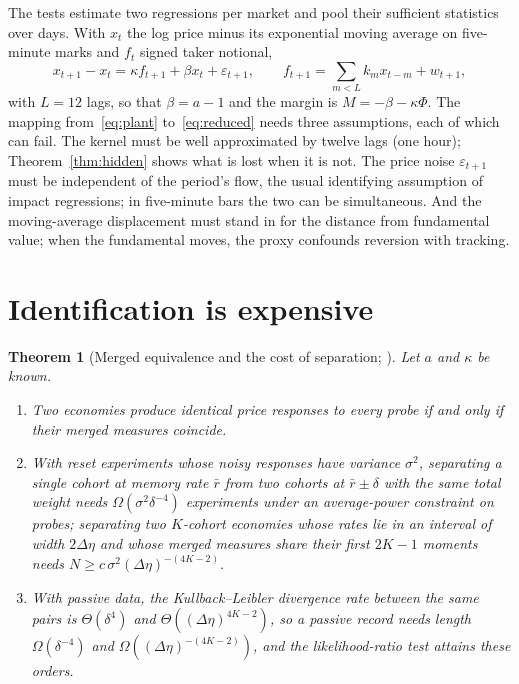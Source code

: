 \documentclass[12pt]{article}
\newtheorem{theorem}{Theorem}
\theoremstyle{definition}
\theoremstyle{remark}
\begin{document}
The tests estimate two regressions per market and pool their sufficient statistics over days. With $x_t$ the log price minus its exponential moving average on five-minute marks and $f_t$ signed taker notional,
\begin{equation}\label{eq:reduced}
x_{t+1}-x_t=\kappa f_{t+1}+\beta x_t+\varepsilon_{t+1},\qquad f_{t+1}=\sum_{m<L}k_mx_{t-m}+w_{t+1},
\end{equation}
with $L=12$ lags, so that $\beta=a-1$ and the margin is $M=-\beta-\kappa\Phi$. The mapping from~\eqref{eq:plant} to~\eqref{eq:reduced} needs three assumptions, each of which can fail. The kernel must be well approximated by twelve lags (one hour); Theorem~\ref{thm:hidden} shows what is lost when it is not. The price noise $\varepsilon_{t+1}$ must be independent of the period's flow, the usual identifying assumption of impact regressions; in five-minute bars the two can be simultaneous. And the moving-average displacement must stand in for the distance from fundamental value; when the fundamental moves, the proxy confounds reversion with tracking.

\section{Identification is expensive}\label{sec:identify}

\begin{theorem}[Merged equivalence and the cost of separation; \citealp{niroula2026a}]\label{thm:identify}
Let $a$ and $\kappa$ be known.
\begin{enumerate}[label=(\roman*)]
\item Two economies produce identical price responses to every probe if and only if their merged measures coincide.
\item With reset experiments whose noisy responses have variance $\sigma^2$, separating a single cohort at memory rate $\bar r$ from two cohorts at $\bar r\pm\delta$ with the same total weight needs $\Omega(\sigma^2\delta^{-4})$ experiments under an average-power constraint on probes; separating two $K$-cohort economies whose rates lie in an interval of width $2\Delta\eta$ and whose merged measures share their first $2K-1$ moments needs $N\ge c\,\sigma^2(\Delta\eta)^{-(4K-2)}$.
\item With passive data, the Kullback--Leibler divergence rate between the same pairs is $\Theta(\delta^4)$ and $\Theta((\Delta\eta)^{4K-2})$, so a passive record needs length $\Omega(\delta^{-4})$ and $\Omega((\Delta\eta)^{-(4K-2)})$, and the likelihood-ratio test attains these orders.
\end{enumerate}
\end{theorem}
\end{document}
